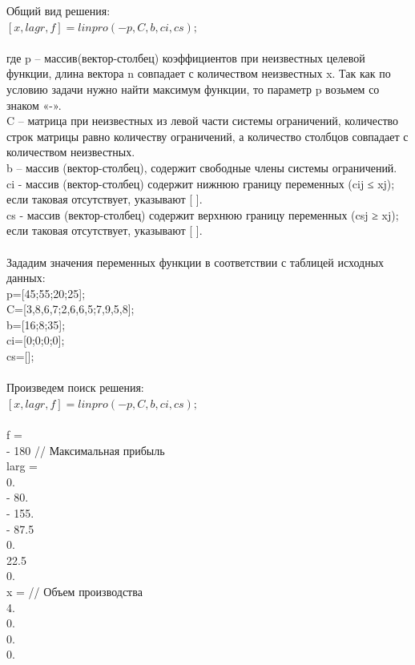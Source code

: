 \documentclass[russian,utf8,nocolumnxxxi,nocolumnxxxii]{eskdtext}
\begin{document}
Общий вид решения:\\
$[x,lagr,f]=linpro(-p,C,b,ci,cs);$\\
\\
где p – массив(вектор-столбец) коэффициентов при неизвестных целевой функции, длина вектора n совпадает с количеством неизвестных x. Так как по условию задачи нужно найти максимум функции, то параметр p возьмем со знаком «-».\\
C – матрица при неизвестных из левой части системы ограничений, количество строк матрицы равно количеству ограничений, а количество столбцов совпадает с количеством неизвестных.\\
b – массив (вектор-столбец), содержит свободные члены системы ограничений.\\
ci - массив (вектор-столбец) содержит нижнюю границу переменных (cij ≤ xj); если таковая отсутствует, указывают [ ].\\
cs - массив (вектор-столбец) содержит верхнюю границу переменных (csj ≥ xj); если таковая отсутствует, указывают [ ].\\
\\
Зададим значения переменных функции в соответствии с таблицей исходных данных:\\
p=[45;55;20;25];\\
C=[3,8,6,7;2,6,6,5;7,9,5,8];\\
b=[16;8;35];\\
ci=[0;0;0;0];\\
cs=[];\\
\\
\newpage
Произведем поиск решения:\\
$[x,lagr,f]=linpro(-p,C,b,ci,cs);$\\
\\
f  =\\
  - 180  // Максимальная прибыль\\
 larg  =\\
    0.   \\  
  - 80.   \\
  - 155.\\
  - 87.5   \\
    0.   \\
    22.5   \\
    0.     \\
 x  =		// Объем производства\\
    4. \\
    0.    \\
    0.    \\
    0. \\
\end{document}
